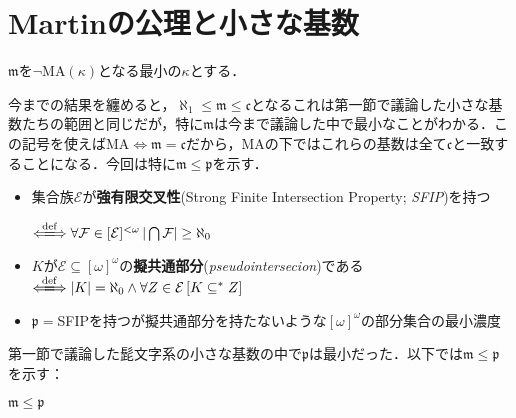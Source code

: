 \documentclass[a4j]{bxjsarticle}
\newcommand{\MA}{\mathrm{MA}}
\theoremstyle{definition}
\begin{document}
\section{Martinの公理と小さな基数}
\begin{definition}
 $\mathfrak{m}$を$\neg \MA(\kappa)$となる最小の$\kappa$とする．
\end{definition}
今までの結果を纏めると，$\aleph_1 \leq \mathfrak{m} \leq \mathfrak{c}$となるこれは第一節で議論した小さな基数たちの範囲と同じだが，特に$\mathfrak{m}$は今まで議論した中で最小なことがわかる．この記号を使えば$\MA \Leftrightarrow \mathfrak{m} = \mathfrak{c}$だから，$\MA$の下ではこれらの基数は全て$\mathfrak{c}$と一致することになる．今回は特に$\mathfrak{m} \leq \mathfrak{p}$を示す．

\begin{definition}
 \begin{itemize}
  \item 集合族$\mathcal{E}$が\textbf{強有限交叉性}(Strong Finite Intersection Property; \textit{SFIP})を持つ

	$\defs \forall \mathcal{F} \in [\mathcal{E}]^{<\omega} \, |\bigcap \mathcal{F}| \geq \aleph_0$
  \item $K$が$\mathcal{E} \subseteq [\omega]^\omega$の\textbf{擬共通部分}(\textit{pseudointersecion})である
	$\defs |K| = \aleph_0 \wedge \forall Z \in \mathcal{E} \,[ K \mathrel{\mathord{\subseteq}^*} Z]$
  \item $\mathfrak{p} = $SFIPを持つが擬共通部分を持たないような$[\omega]^\omega$の部分集合の最小濃度
 \end{itemize}
\end{definition}
第一節で議論した髭文字系の小さな基数の中で$\mathfrak{p}$は最小だった．以下では$\mathfrak{m} \leq \mathfrak{p}$を示す：
\begin{lemma}\label{lem:p}
 $\mathfrak{m} \leq \mathfrak{p}$
\end{lemma}
\end{document}
